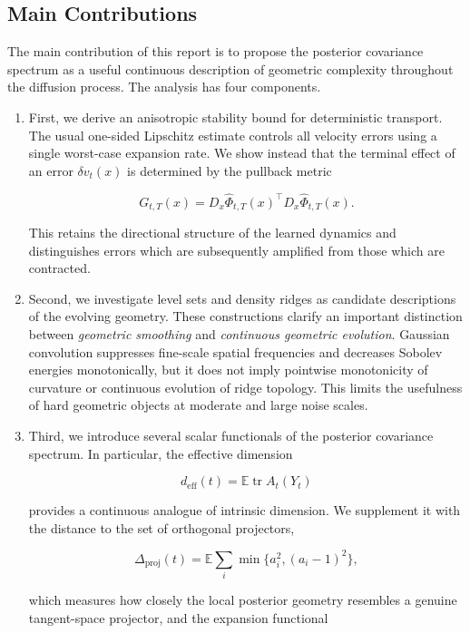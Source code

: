 \documentclass{article}
\DeclareMathOperator{\tr}{tr}
\newcommand{\E}{\mathbb{E}}
\newcommand{\deff}{d_{\mathrm{eff}}}
\newcommand{\dproj}{\Delta_{\mathrm{proj}}}
\theoremstyle{plain}
\theoremstyle{definition}
\theoremstyle{remark}
\begin{document}
\subsection{Main Contributions}
\label{subsec:main-contributions}

The main contribution of this report is to propose the posterior covariance spectrum as a useful continuous description of geometric complexity throughout the diffusion process. The analysis has four components.

\begin{enumerate}
    \item First, we derive an anisotropic stability bound for deterministic transport. The usual one-sided Lipschitz estimate controls all velocity errors using a single worst-case expansion rate. We show instead that the terminal effect of an error $\delta v_t(x)$ is determined by the pullback metric

    $$
        G_{t,T}(x)
        =
        D_x\hat{\Phi}_{t,T}(x)^\top
        D_x\hat{\Phi}_{t,T}(x).
    $$
    
    This retains the directional structure of the learned dynamics and distinguishes errors which are subsequently amplified from those which are contracted.
    \item Second, we investigate level sets and density ridges as candidate descriptions of the evolving geometry. These constructions clarify an important distinction between \emph{geometric smoothing} and \emph{continuous geometric evolution}. Gaussian convolution suppresses fine-scale spatial frequencies and decreases Sobolev energies monotonically, but it does not imply pointwise monotonicity of curvature or continuous evolution of ridge topology. This limits the usefulness of hard geometric objects at moderate and large noise scales.
    
    \item Third, we introduce several scalar functionals of the posterior covariance spectrum. In particular, the effective dimension

    $$
        \deff(t)
        =
        \E\tr A_t(Y_t)
    $$
    
    provides a continuous analogue of intrinsic dimension. We supplement it with the distance to the set of orthogonal projectors,
    
    $$
        \dproj(t)
        =
        \E\sum_i
        \min\{a_i^2,(a_i-1)^2\},
    $$
    
    which measures how closely the local posterior geometry resembles a genuine tangent-space projector, and the expansion functional
    

\end{enumerate}
\end{document}
